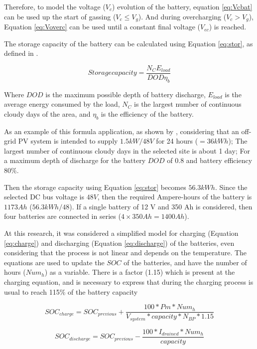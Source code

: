 Therefore, to model the voltage ($ V_{c} $) evolution of the battery, equation \ref{eq:Vcbat} can be used up the start of gassing ($ V_{c} \leq V_{g} $). And during overcharging ($ V_{c} > V_{g} $), Equation \ref{eq:Voverc} can be used until a constant final voltage ($ V_{ec} $) is reached.

The storage capacity of the battery can be calculated using Equation \ref{eq:stor}, as defined in \cite{Wenham}.

\begin{equation}
\label{eq:stor}
Storage capacity = \dfrac{N_{C}E_{load}}{DOD \eta _{b}}
\end{equation}

Where $ DOD $ is the maximum possible depth of battery discharge, $ E_{load} $ is the average energy consumed by the load, $ N_{C} $ is the largest number of continuous cloudy days of the area, and $ \eta_{b} $ is the efficiency of the battery.

As an example of this formula application, as shown by \cite{Abdulateef}, considering that an off-grid PV system is intended to supply $1.5 kW/48 V$ for 24 hours ($=36 kWh$); The largest number of continuous cloudy days in the selected site is about 1 day; For a maximum depth of discharge for the battery $DOD$ of $0.8$ and battery efficiency $80\%$.

Then the storage capacity using Equation \ref{eq:stor} becomes $56.3 kWh$. Since the selected DC bus voltage is $48 V$, then the required Ampere-hours of the battery is $1173 Ah$ ($56.3 kWh/48$). If a single battery of 12 V and 350 Ah is considered, then four batteries are connected in series ($4 \times 350 Ah = 1400 Ah$).

At this research, it was considered a simplified model for charging (Equation \ref{eq:charge}) and discharging (Equation \ref{eq:discharge}) of the batteries, even considering that the process is not linear and depends on the temperature. The equations are used to update the $SOC$ of the batteries, and have the number of hours ($ Num_{h} $) as a variable. There is a factor (1.15) which is present at the charging equation, and is necessary to express that during the charging process is usual to reach 115\% of the battery capacity

\begin{equation}
\label{eq:charge}
SOC_{charge} = SOC_{previous} + \dfrac{100*Pm*Num_{h}}{V_{system}*capacity*N_{BP}*1.15}
\end{equation}

\begin{equation}
\label{eq:discharge}
SOC_{discharge} = SOC_{previous} - \dfrac{100*I_{drained}*Num_{h}}{capacity}
\end{equation}


